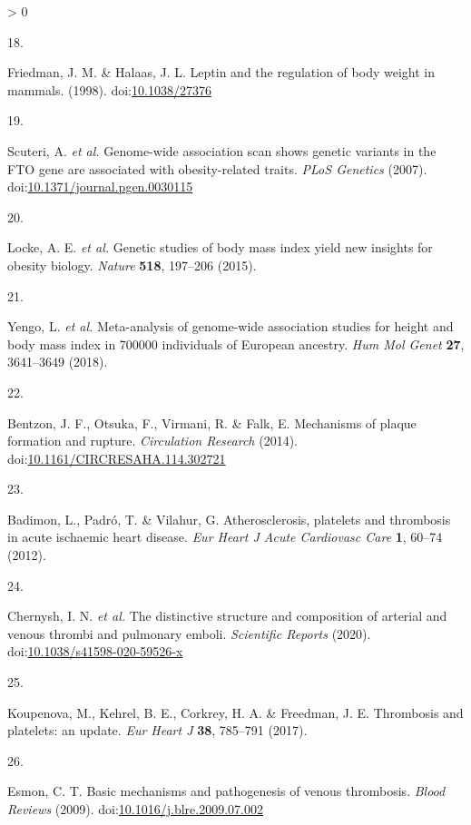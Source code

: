 \documentclass[11pt,twoside]{bristolthesis}
\newlength{\cslhangindent}
\newlength{\csllabelwidth}
\newenvironment{CSLReferences}[2] %
 {%
  \setlength{\parindent}{0pt}
  \ifodd #1 \everypar{\setlength{\hangindent}{\cslhangindent}}\ignorespaces\fi
  \ifnum #2 > 0
  \setlength{\parskip}{#2\baselineskip}
  \fi
 }%
 {}
\newcommand{\CSLLeftMargin}[1]{\parbox[t]{\csllabelwidth}{#1}}
\newcommand{\CSLRightInline}[1]{\parbox[t]{\linewidth - \csllabelwidth}{#1}\break}
\begin{document}
\begin{CSLReferences}{0}{0}
\leavevmode\hypertarget{ref-Friedman1998}{}%
\CSLLeftMargin{18. }
\CSLRightInline{Friedman, J. M. \& Halaas, J. L. {Leptin and the regulation of body weight in mammals}. (1998). doi:\href{https://doi.org/10.1038/27376}{10.1038/27376}}

\leavevmode\hypertarget{ref-Scuteri2007}{}%
\CSLLeftMargin{19. }
\CSLRightInline{Scuteri, A. \emph{et al.} {Genome-wide association scan shows genetic variants in the FTO gene are associated with obesity-related traits}. \emph{PLoS Genetics} (2007). doi:\href{https://doi.org/10.1371/journal.pgen.0030115}{10.1371/journal.pgen.0030115}}

\leavevmode\hypertarget{ref-Locke2015}{}%
\CSLLeftMargin{20. }
\CSLRightInline{Locke, A. E. \emph{et al.} {Genetic studies of body mass index yield new insights for obesity biology}. \emph{Nature} \textbf{518}, 197--206 (2015).}

\leavevmode\hypertarget{ref-Yengo2018}{}%
\CSLLeftMargin{21. }
\CSLRightInline{Yengo, L. \emph{et al.} {Meta-analysis of genome-wide association studies for height and body mass index in 700000 individuals of European ancestry}. \emph{Hum Mol Genet} \textbf{27}, 3641--3649 (2018).}

\leavevmode\hypertarget{ref-Bentzon2014}{}%
\CSLLeftMargin{22. }
\CSLRightInline{Bentzon, J. F., Otsuka, F., Virmani, R. \& Falk, E. {Mechanisms of plaque formation and rupture}. \emph{Circulation Research} (2014). doi:\href{https://doi.org/10.1161/CIRCRESAHA.114.302721}{10.1161/CIRCRESAHA.114.302721}}

\leavevmode\hypertarget{ref-Badimon2012}{}%
\CSLLeftMargin{23. }
\CSLRightInline{Badimon, L., Padró, T. \& Vilahur, G. {Atherosclerosis, platelets and thrombosis in acute ischaemic heart disease}. \emph{Eur Heart J Acute Cardiovasc Care} \textbf{1}, 60--74 (2012).}

\leavevmode\hypertarget{ref-Chernysh2020}{}%
\CSLLeftMargin{24. }
\CSLRightInline{Chernysh, I. N. \emph{et al.} {The distinctive structure and composition of arterial and venous thrombi and pulmonary emboli}. \emph{Scientific Reports} (2020). doi:\href{https://doi.org/10.1038/s41598-020-59526-x}{10.1038/s41598-020-59526-x}}

\leavevmode\hypertarget{ref-Koupenova2017a}{}%
\CSLLeftMargin{25. }
\CSLRightInline{Koupenova, M., Kehrel, B. E., Corkrey, H. A. \& Freedman, J. E. {Thrombosis and platelets: an update}. \emph{Eur Heart J} \textbf{38}, 785--791 (2017).}

\leavevmode\hypertarget{ref-Esmon2009}{}%
\CSLLeftMargin{26. }
\CSLRightInline{Esmon, C. T. {Basic mechanisms and pathogenesis of venous thrombosis}. \emph{Blood Reviews} (2009). doi:\href{https://doi.org/10.1016/j.blre.2009.07.002}{10.1016/j.blre.2009.07.002}}


\end{CSLReferences}
\end{document}
